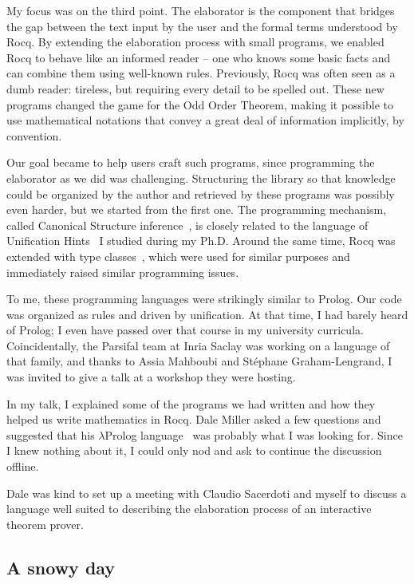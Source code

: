 \documentclass{these-ISSS}
\begin{document}
My focus was on the third point. The elaborator is the component that bridges
the gap between the text input by the user and the formal terms understood by
Rocq. By extending the elaboration process with small programs, we enabled Rocq
to behave like an informed reader -- one who knows some basic facts and can
combine them using well-known rules. Previously, Rocq was often seen as a
dumb reader: tireless, but requiring every detail to be spelled out. These
new programs changed the game for the Odd Order Theorem, making it possible to
use mathematical notations that convey a great deal of information implicitly,
by convention. 

Our goal became to help users craft such programs, since
programming the elaborator as we did was challenging. Structuring the library
so that knowledge could be organized by the author and retrieved by these
programs was possibly even harder, but we started from the first one.
The programming mechanism, called Canonical Structure
inference~\cite{tassi13}, is closely related to the language of Unification
Hints~\cite{asperti09} I studied during my Ph.D. Around the same time, Rocq was
extended with type classes~\cite{fctc}, which were used for similar purposes
and immediately raised similar programming issues.

To me, these programming languages were strikingly similar to Prolog. Our code was organized
as rules and driven by unification. At that time, I had barely heard of Prolog;
I even have passed over that course in my university curricula.
Coincidentally, the Parsifal team at Inria Saclay was working on a language of
that family, and thanks to Assia Mahboubi and St\'ephane Graham-Lengrand, I was invited
to give a talk at a workshop they were hosting.

In my talk, I explained some of the programs we had written and how they helped
us write mathematics in Rocq. Dale Miller asked a few questions and suggested
that his $\lambda$Prolog language~\cite{10.1093/logcom/1.4.497} was probably
what I was looking for. Since I knew nothing about it, I could only nod and ask
to continue the discussion offline.

Dale was kind to set up a meeting with Claudio Sacerdoti and myself to
discuss a language well suited to describing the elaboration process of an
interactive theorem prover.

\subsection{A snowy day}
\end{document}
